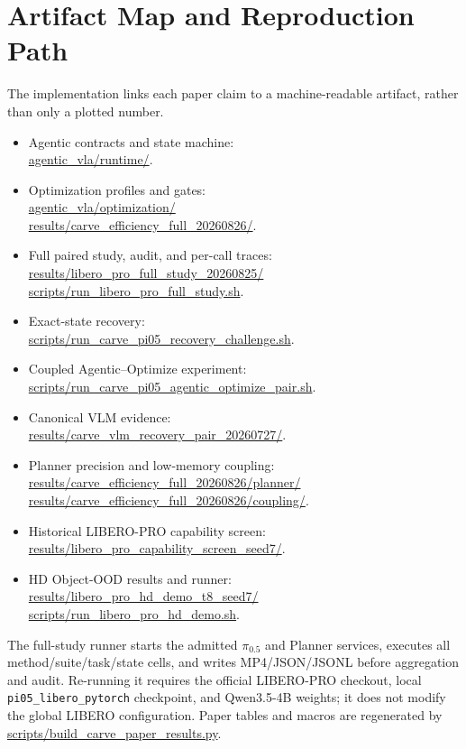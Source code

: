 \documentclass[runningheads]{waica}
\newcommand{\pizero}{$\pi_{0.5}$}
\begin{document}
\section{Artifact Map and Reproduction Path}
\label{app:artifacts}

The implementation links each paper claim to a machine-readable artifact,
rather than only a plotted number.
{\footnotesize
\begin{itemize}
    \item Agentic contracts and state machine:\\
    \url{agentic_vla/runtime/}.
    \item Optimization profiles and gates:\\
    \url{agentic_vla/optimization/}\\
    \url{results/carve_efficiency_full_20260826/}.
    \item Full paired study, audit, and per-call traces:\\
    \url{results/libero_pro_full_study_20260825/}\\
    \url{scripts/run_libero_pro_full_study.sh}.
    \item Exact-state recovery:\\
    \url{scripts/run_carve_pi05_recovery_challenge.sh}.
    \item Coupled Agentic--Optimize experiment:\\
    \url{scripts/run_carve_pi05_agentic_optimize_pair.sh}.
    \item Canonical VLM evidence:\\
    \url{results/carve_vlm_recovery_pair_20260727/}.
    \item Planner precision and low-memory coupling:\\
    \url{results/carve_efficiency_full_20260826/planner/}\\
    \url{results/carve_efficiency_full_20260826/coupling/}.
    \item Historical LIBERO-PRO capability screen:\\
    \url{results/libero_pro_capability_screen_seed7/}.
    \item HD Object-OOD results and runner:\\
    \url{results/libero_pro_hd_demo_t8_seed7/}\\
    \url{scripts/run_libero_pro_hd_demo.sh}.
\end{itemize}
}
The full-study runner starts the admitted \pizero{} and Planner services,
executes all method/suite/task/state cells, and writes MP4/JSON/JSONL before
aggregation and audit. Re-running it requires the official LIBERO-PRO checkout,
local \texttt{pi05\_libero\_pytorch} checkpoint, and Qwen3.5-4B weights; it
does not modify the global LIBERO configuration. Paper tables and macros are
regenerated by \url{scripts/build_carve_paper_results.py}.
\end{document}
